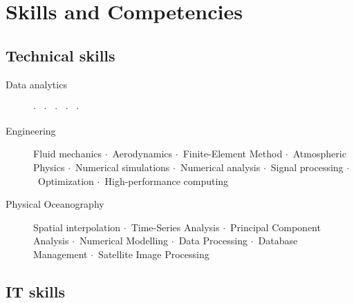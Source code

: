 \documentclass[11pt,a4paper,svgnames]{article}
\newcommand{\sepa}{$\cdot$~}
\begin{document}
\newpage

\section{Skills and Competencies}

\subsection{Technical skills}

\begin{description}

\item[Data analytics]  \sepa {} \sepa {} \sepa {} \sepa {} \sepa {}

\item[Engineering] {Fluid mechanics \sepa Aerodynamics \sepa Finite-Element Method \sepa Atmospheric Physics \sepa Numerical simulations \sepa Numerical analysis \sepa Signal processing \sepa Optimization \sepa High-performance computing}

\item[Physical Oceanography] {Spatial interpolation \sepa Time-Series Analysis \sepa Principal Component Analysis \sepa Numerical Modelling \sepa Data Processing \sepa Database Management \sepa Satellite Image Processing}

\end{description}


\subsection{IT skills}
\end{document}
